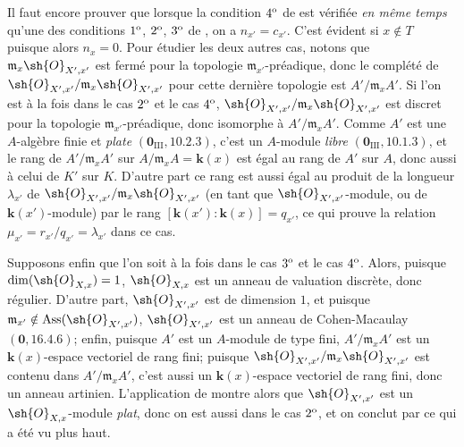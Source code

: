 \begin{env}[21.10.11]
Il faut encore prouver que lorsque la condition $4\textsuperscript{o}$ de  est vérifiée \emph{en même temps} qu'une des conditions $1\textsuperscript{o}$, $2\textsuperscript{o}$, $3\textsuperscript{o}$ de , on a $n_{x'}=c_{x'}$.
C'est évident si $x\notin T$ puisque alors $n_x=0$.
Pour étudier les deux autres cas, notons que $\mathfrak{m}_x\sh{O}_{X',x'}$ est fermé pour la topologie $\mathfrak{m}_{x'}$-préadique, donc le complété de $\sh{O}_{X',x'}/\mathfrak{m}_x\sh{O}_{X',x'}$ pour cette dernière topologie est $A'/\mathfrak{m}_xA'$.
Si l'on est à la fois dans le cas $2\textsuperscript{o}$ et le cas $4\textsuperscript{o}$, $\sh{O}_{X',x'}/\mathfrak{m}_x\sh{O}_{X',x'}$ est discret pour la topologie $\mathfrak{m}_{x'}$-préadique, donc isomorphe à $A'/\mathfrak{m}_xA'$.
Comme $A'$ est une $A$-algèbre finie et \emph{plate} $(\mathbf{0}_{\mathrm{III}},10.2.3)$, c'est un $A$-module \emph{libre} $(\mathbf{0}_{\mathrm{III}},10.1.3)$, et le rang de $A'/\mathfrak{m}_xA'$ sur $A/\mathfrak{m}_xA=\boldsymbol{k}(x)$ est égal au rang de $A'$ sur $A$, donc aussi à celui de $K'$ sur $K$.
D'autre part ce rang est aussi égal au produit de la longueur $\lambda_{x'}$ de $\sh{O}_{X',x'}/\mathfrak{m}_x\sh{O}_{X',x'}$ (en tant que $\sh{O}_{X',x'}$-module, ou de $\boldsymbol{k}(x')$-module) par le rang $[\boldsymbol{k}(x'): \boldsymbol{k}(x)]=q_{x'}$, ce qui prouve la relation $\mu_{x'}=r_{x'}/q_{x'}=\lambda_{x'}$ dans ce cas.

Supposons enfin que l'on soit à la fois dans le cas $3\textsuperscript{o}$ et le cas $4\textsuperscript{o}$.
Alors, puisque $\dim(\sh{O}_{X,x})=1$, $\sh{O}_{X,x}$ est un anneau de valuation discrète, donc régulier.
D'autre part, $\sh{O}_{X',x'}$ est de dimension $1$, et puisque $\mathfrak{m}_{x'}\notin\operatorname{Ass}(\sh{O}_{X',x'})$, $\sh{O}_{X',x'}$ est un anneau de Cohen-Macaulay $(\mathbf{0},16.4.6)$;
enfin, puisque $A'$ est un $A$-module de type fini, $A'/\mathfrak{m}_xA'$ est un $\boldsymbol{k}(x)$-espace vectoriel de rang fini;
puisque $\sh{O}_{X',x'}/\mathfrak{m}_x\sh{O}_{X',x'}$ est contenu dans $A'/\mathfrak{m}_xA'$, c'est aussi un $\boldsymbol{k}(x)$-espace vectoriel de rang fini, donc un anneau artinien.
L'application de  montre alors que $\sh{O}_{X',x'}$ est un $\sh{O}_{X,x}$-module \emph{plat}, donc on est aussi dans le cas $2\textsuperscript{o}$, et on conclut par ce qui a été vu plus haut.


\end{env}

